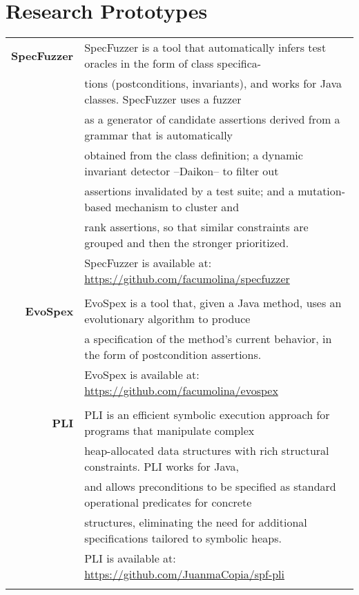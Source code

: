 \documentclass[a4paper,10pt]{article} %
\begin{document}
\section{Research Prototypes}
\begin{longtable}{rl}


\textbf{SpecFuzzer} & SpecFuzzer is a tool that automatically infers test oracles in the form of class specifica-\\ 
& tions (postconditions, invariants), and works for Java classes. SpecFuzzer uses a fuzzer \\
& as a generator of candidate assertions derived from a grammar that is automatically \\
& obtained from the class definition; a dynamic invariant detector –Daikon– to filter out \\
& assertions invalidated by a test suite; and a mutation-based mechanism to cluster and \\
& rank assertions, so that similar constraints are grouped and then the stronger prioritized. \\ 
& SpecFuzzer is available at: \href{https://github.com/facumolina/specfuzzer}{https://github.com/facumolina/specfuzzer} \\ & \\


\textbf{EvoSpex} & EvoSpex is a tool that, given a Java method, uses an evolutionary algorithm to produce \\ 
& a specification of the method's current behavior, in the form of postcondition assertions. \\
& EvoSpex is available at: \href{https://github.com/facumolina/evospex}{https://github.com/facumolina/evospex} \\ & \\

\textbf{PLI} & PLI is an efficient symbolic execution approach for programs that manipulate complex \\
& heap-allocated data structures with rich structural constraints. PLI works for Java, \\
& and allows preconditions to be specified as standard operational predicates for concrete \\
& structures, eliminating the need for additional specifications tailored to symbolic heaps. \\
& PLI is available at: \href{https://github.com/JuanmaCopia/spf-pli}{https://github.com/JuanmaCopia/spf-pli} \\ & \\

\end{longtable}
\end{document}
